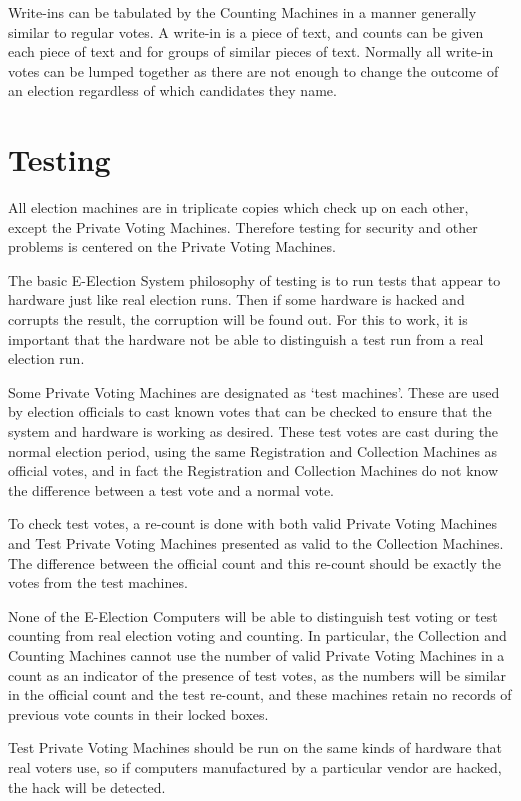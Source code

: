 \documentclass[12pt]{article}
\begin{document}
Write-ins can be tabulated by the Counting Machines in a manner
generally similar to regular votes.  A write-in is a piece of
text, and counts can be given each piece of text and for groups
of similar pieces of text.  Normally all write-in votes can
be lumped together as there are not enough to change the outcome
of an election regardless of which candidates they name.

\section{Testing}\label{TESTING}

All election machines are in triplicate copies which check up on each
other, except the Private Voting Machines.  Therefore testing
for security and other problems is centered on the Private Voting
Machines.

The basic E-Election System philosophy of testing is to run tests
that appear to hardware just like real election runs.  Then if
some hardware is hacked and corrupts the result, the corruption
will be found out.  For this to work, it is important that the
hardware not be able to distinguish a test run from a real election run.

Some Private Voting Machines are designated as
`test machines'\label{TEST-MACHINE}.
These are used by election officials to cast known votes that can
be checked to ensure that the system and hardware is working as
desired.  These test votes are cast during the normal election
period, using the same Registration and Collection Machines
as official votes, and in fact the Registration and Collection Machines
do not know the difference between a test vote and a normal vote.

To check test votes, a re-count is done with both valid Private Voting
Machines and Test Private Voting Machines presented as valid to the
Collection Machines.  The difference between the official count and
this re-count should be exactly the votes from the test machines.

None of the E-Election Computers will be able to distinguish
test voting or test counting from real election voting and counting.
In particular, the Collection and Counting Machines cannot use the
number of valid Private Voting Machines in a count as an indicator
of the presence of test votes, as the numbers will be similar in the
official count and the test re-count, and these machines retain no
records of previous vote counts in their locked boxes.

Test Private Voting Machines should be run on the same kinds of
hardware that real voters use, so if computers manufactured by a
particular vendor are hacked, the hack will be detected.
\end{document}
